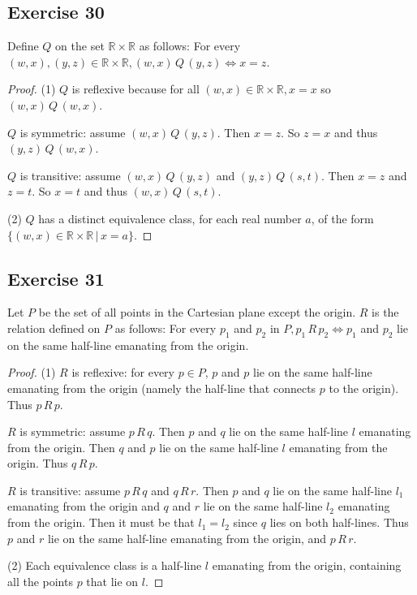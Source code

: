 \documentclass[14pt]{extarticle}
\newcommand{\R}{\mathbb{R}}
\begin{document}
\subsection{Exercise 30}
Define $Q$ on the set \(\R \times \R\) as follows: For every \((w, x), (y, z) \in \R \times \R, (w, x) \,Q \,
(y, z) \iff x = z\).

\begin{proof}
        (1) $Q$ is reflexive because for all \((w, x) \in \R \times \R, x = x\) so \((w, x) \,Q\, (w, x)\).

        $Q$ is symmetric: assume \((w, x) \,Q\, (y,z)\). Then \(x = z\). So \(z = x\) and thus \((y,z) \,Q\, (w, x)\).

        $Q$ is transitive: assume \((w, x) \,Q\, (y,z)\) and \((y,z) \,Q\, (s,t)\). Then \(x = z\) and \(z = t\). So
        \(x = t\) and thus \((w,x) \,Q\, (s,t)\).

        (2) $Q$ has a distinct equivalence class, for each real number $a$, of the form \(\{(w,x) \in \R \times \R \,|\,
        x = a\}\).
\end{proof}

\subsection{Exercise 31}
Let $P$ be the set of all points in the Cartesian plane except the origin. $R$ is the relation defined on $P$ as
follows: For every \(p_1\) and \(p_2\) in \(P, p_1 \,R\, p_2 \iff p_1\) and \(p_2\) lie on the same half-line
emanating from the origin.

\begin{proof}
        (1) $R$ is reflexive: for every \(p \in P\), $p$ and $p$ lie on the same half-line emanating from the origin (namely
        the half-line that connects $p$ to the origin). Thus \(p \,R\, p\).

        $R$ is symmetric: assume \(p\,R\,q\). Then $p$ and $q$ lie on the same half-line $l$ emanating from the origin. Then
        $q$ and $p$ lie on the same half-line $l$ emanating from the origin. Thus \(q \,R\,p\).

        $R$ is transitive: assume \(p \,R\,q\) and \(q \,R\,r\). Then $p$ and $q$ lie on the same half-line $l_1$ emanating
        from the origin and $q$ and $r$ lie on the same half-line $l_2$ emanating from the origin. Then it must be that
        \(l_1 = l_2\) since $q$ lies on both half-lines. Thus $p$ and $r$ lie on the same half-line emanating from the
        origin, and \(p\,R\,r\).

        (2) Each equivalence class is a half-line $l$ emanating from the origin, containing all the points $p$ that lie on $l$.
\end{proof}
\end{document}
